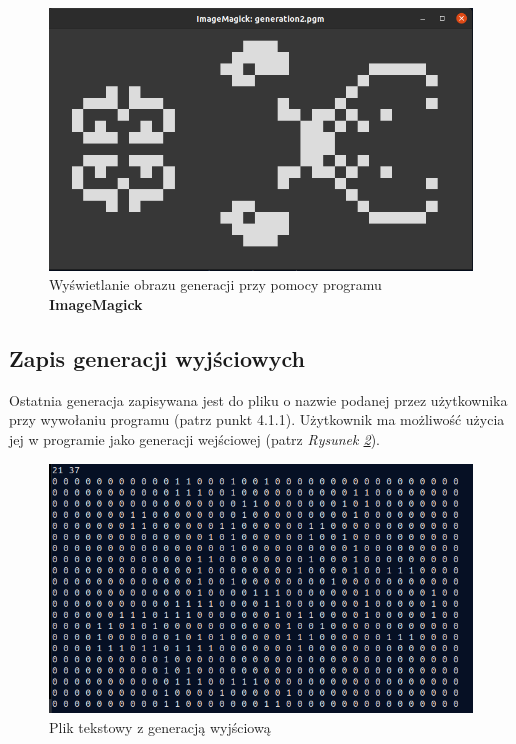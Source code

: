 \documentclass[a4paper]{article}
\begin{document}
\begin{figure}[h!]
        \centering
        \includegraphics[scale=0.4]{imagemagik}
	\caption{Wy\'swietlanie obrazu generacji przy pomocy programu \textbf{ImageMagick}}
        \label{fig:imagemagik}
\end{figure}

\subsection{Zapis generacji wyj\'sciowych}
\quad Ostatnia generacja zapisywana jest do pliku o nazwie podanej przez u\.zytkownika przy wywo\l{}aniu programu (patrz punkt 4.1.1).
U\.zytkownik ma mo\.zliwo\'s\'c u\.zycia jej w programie jako generacji wej\'sciowej (patrz \textit{Rysunek \ref{fig:wyjscie}}).

\begin{figure}[h!]
        \centering
        \includegraphics[scale=0.5]{wyjscie}
	\caption{Plik tekstowy z generacj\k{a} wyj\'sciow\k{a}}
        \label{fig:wyjscie}
\end{figure}
\end{document}
